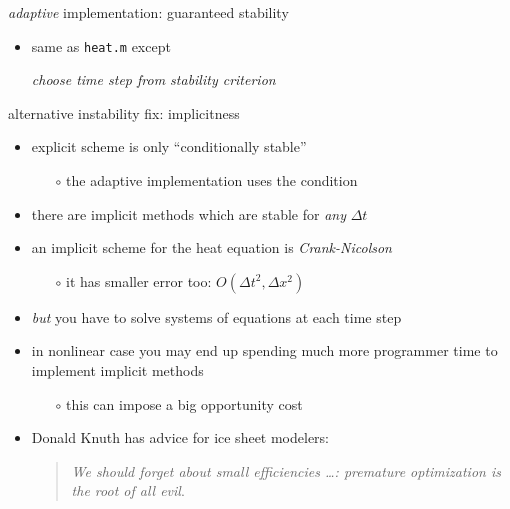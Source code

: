 \begin{frame}{\textsl{adaptive} implementation: guaranteed stability}

\scriptsize
{}
\normalsize

\begin{itemize}
\item same as \texttt{heat.m} except

\begin{center}
\emph{choose time step from stability criterion}
\end{center}
\end{itemize}\end{frame}


\begin{frame}{alternative instability fix: implicitness}

\begin{itemize}
\item explicit scheme is only ``conditionally stable''
  \begin{itemize}
  \item[$\circ$] the adaptive implementation uses the condition
  \end{itemize}
\item there are \alert{implicit} methods which are stable for \emph{any} $\Delta t$
\item an implicit scheme for the heat equation is \emph{Crank-Nicolson}
  \begin{itemize}
  \item[$\circ$] it has smaller error too: $O(\Delta t^2,\Delta x^2)$
  \end{itemize}
\item \emph{but} you have to solve systems of equations at each time step
\item in nonlinear case you may end up spending much more programmer time to implement implicit methods
  \begin{itemize}
  \item[$\circ$] this can impose a big opportunity cost
  \end{itemize}
\vspace{5mm}

\item \small Donald Knuth has advice for ice sheet modelers: \begin{quote}
\emph{We should forget about small efficiencies \dots: premature optimization is the root of all evil}.
\end{quote}
\end{itemize}
\end{frame}


